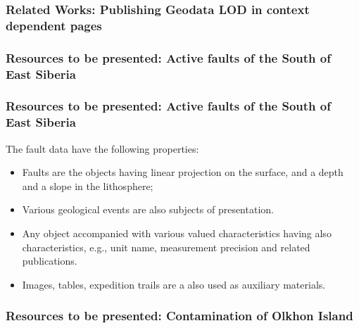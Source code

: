 \documentclass[10pt]{beamer}
\begin{document}
\begin{frame}
  \frametitle{Related Works: Publishing Geodata LOD in context dependent pages}
\end{frame}


\begin{frame}
  \frametitle{Resources to be presented: Active faults of the South of
    East Siberia}
\end{frame}

\begin{frame}
  \frametitle{Resources to be presented: Active faults of the South of
    East Siberia}
  The fault data have the following properties:
  \begin{itemize}
  \item Faults are the objects having linear projection on the surface, and a depth and a slope in the lithosphere;
  \item Various geological events are also subjects of presentation.
  \item Any object accompanied with various valued characteristics having also characteristics, e.g., unit name, measurement precision and related publications.
  \item Images, tables, expedition trails are a also used as auxiliary materials.
  \end{itemize}
\end{frame}

\begin{frame}
  \frametitle{Resources to be presented:  Contamination of  Olkhon Island}
\end{frame}
\end{document}
